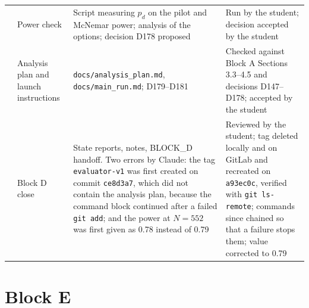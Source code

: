 \documentclass[11pt,a4paper]{report}
\begin{document}
{\begin{longtable}{
  >{\raggedright\arraybackslash}p{0.6cm}
  >{\raggedright\arraybackslash}p{4.4cm}
  >{\raggedright\arraybackslash}p{4.4cm}
  >{\raggedright\arraybackslash}p{4.8cm}}
99 & Power check
  & Script measuring $p_d$ on the pilot and McNemar power; analysis of the options; decision D178 proposed
  & Run by the student; decision accepted by the student \\
100 & Analysis plan and launch instructions
  & \texttt{docs/analysis\_plan.md}, \texttt{docs/main\_run.md}; D179--D181
  & Checked against Block A Sections 3.3--4.5 and decisions D147--D178; accepted by the student \\
101 & Block D close
  & State reports, notes, BLOCK\_D handoff. Two errors by Claude: the tag \texttt{evaluator-v1} was first created on commit \texttt{ce8d3a7}, which did not contain the analysis plan, because the command block continued after a failed \texttt{git add}; and the power at $N=552$ was first given as 0.78 instead of 0.79
  & Reviewed by the student; tag deleted locally and on GitLab and recreated on \texttt{a93ec0c}, verified with \texttt{git ls-remote}; commands since chained so that a failure stops them; value corrected to 0.79 \\

  
  
\end{longtable}
}
\section{Block E}\label{sec:ailog-e}
\end{document}
